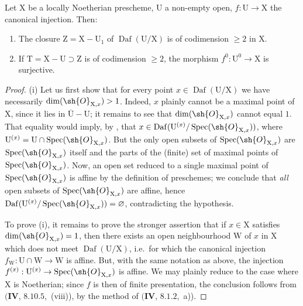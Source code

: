 \begin{theorem}[21.12.6]
\label{IV.21.12.6}
Let $\mathrm{X}$ be a locally Noetherian prescheme, $\mathrm{U}$ a non-empty open, $f:\mathrm{U}\to\mathrm{X}$ the canonical injection.
Then:
\begin{enumerate}[label=(\roman*)]
  \item The closure $\mathrm{Z}=\mathrm{X}-\mathrm{U}_1$ of $\operatorname{Daf}(\mathrm{U}/\mathrm{X})$ is of codimension $\geq 2$ in $\mathrm{X}$.
  \item If $\mathrm{T}=\mathrm{X}-\mathrm{U}\supset\mathrm{Z}$ is of codimension $\geq 2$, the morphism $f^0:\mathrm{U}^0\to\mathrm{X}$ is surjective.
\end{enumerate}
\end{theorem}

\begin{proof}
(i) Let us first show that for every point $x\in\operatorname{Daf}(\mathrm{U}/\mathrm{X})$ we have necessarily $\dim(\sh{O}_{\mathrm{X},x})>1$.
Indeed, $x$ plainly cannot be a maximal point of $\mathrm{X}$, since it lies in $\overline{\mathrm{U}}-\mathrm{U}$; it remains to see that $\dim(\sh{O}_{\mathrm{X},x})$ cannot equal $1$.
That equality would imply, by , that $x\in\operatorname{Daf}(\mathrm{U}^{(x)}/\operatorname{Spec}(\sh{O}_{\mathrm{X},x}))$, where $\mathrm{U}^{(x)}=\mathrm{U}\cap\operatorname{Spec}(\sh{O}_{\mathrm{X},x})$.
But the only open subsets of $\operatorname{Spec}(\sh{O}_{\mathrm{X},x})$ are $\operatorname{Spec}(\sh{O}_{\mathrm{X},x})$ itself and the parts of the (finite) set of maximal points of $\operatorname{Spec}(\sh{O}_{\mathrm{X},x})$.
Now, an open set reduced to a single maximal point of $\operatorname{Spec}(\sh{O}_{\mathrm{X},x})$ is affine by the definition of preschemes; we conclude that \emph{all} open subsets of $\operatorname{Spec}(\sh{O}_{\mathrm{X},x})$ are affine, hence $\operatorname{Daf}(\mathrm{U}^{(x)}/\operatorname{Spec}(\sh{O}_{\mathrm{X},x}))=\varnothing$, contradicting the hypothesis.

To prove (i), it remains to prove the stronger assertion that if $x\in\mathrm{X}$ satisfies $\dim(\sh{O}_{\mathrm{X},x})=1$, then there exists an open neighbourhood $\mathrm{W}$ of $x$ in $\mathrm{X}$ which does not meet $\operatorname{Daf}(\mathrm{U}/\mathrm{X})$, i.e.\ for which the canonical injection $f_{\mathrm{W}}:\mathrm{U}\cap\mathrm{W}\to\mathrm{W}$ is affine.
But, with the same notation as above, the injection $f^{(x)}:\mathrm{U}^{(x)}\to\operatorname{Spec}(\sh{O}_{\mathrm{X},x})$ is affine.
We may plainly reduce to the case where $\mathrm{X}$ is Noetherian; since $f$ is then of finite presentation, the conclusion follows from $(\mathbf{IV}$, $8.10.5$,~(viii)), by the method of $(\mathbf{IV}$, $8.1.2$,~a)).


\end{proof}
